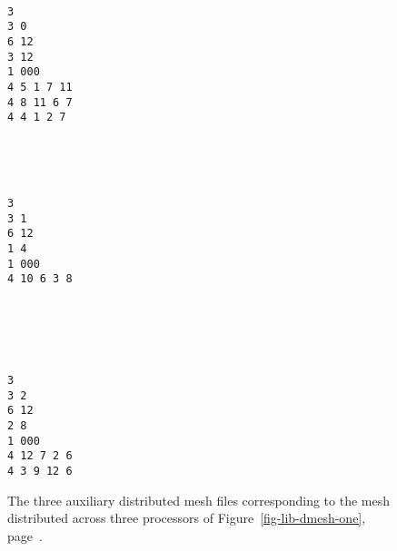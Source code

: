 \begin{figure}[hbt]
\begin{center}
\begin{minipage}{4.0cm}
{\renewcommand{\baselinestretch}{1.05}
 \footnotesize \tt
\begin{verbatim}
3
3 0
6 12
3 12
1 000
4 5 1 7 11
4 8 11 6 7
4 4 1 2 7
\end{verbatim}}
\end{minipage}
\hfil~\hfil
\begin{minipage}{4.0cm}
{\renewcommand{\baselinestretch}{1.05}
 \footnotesize \tt
\begin{verbatim}
3
3 1
6 12
1 4
1 000
4 10 6 3 8


\end{verbatim}}
\end{minipage}
\hfil~\hfil
\begin{minipage}{4.0cm}
{\renewcommand{\baselinestretch}{1.05}
 \footnotesize \tt
\begin{verbatim}
3
3 2
6 12
2 8
1 000
4 12 7 2 6
4 3 9 12 6

\end{verbatim}}
\end{minipage}
\caption{The three auxiliary distributed mesh files corresponding to the
mesh distributed across three processors of
Figure~\ref{fig-lib-dmesh-one}, page~\pageref{fig-lib-dmesh-one}.}
\label{fig-file-admesh}
\end{center}
\end{figure}
